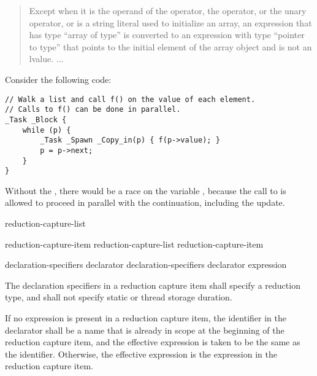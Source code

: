 \begin{quote}
Except when it
is the operand of the  operator,
the  operator,
or the unary \tcode{\&} operator,
or is a string literal used to initialize an array,
an expression that has type ``array of type''
is converted to an expression with type ``pointer to type''
that points to the initial element of the array object
and is not an lvalue. ...
\end{quote}

\begin{example}
Consider the following code:

\begin{verbatim}
// Walk a list and call f() on the value of each element.
// Calls to f() can be done in parallel.
_Task _Block {
    while (p) {
        _Task _Spawn _Copy_in(p) { f(p->value); }
        p = p->next;
    }
}
\end{verbatim}
Without the ,
there would be a race on the variable ,
because the call to 
is allowed to proceed in parallel with the continuation,
including the update.
\end{example}



\begin{bnf}
\br
{} \terminal{(} reduction-capture-list \terminal{)}
\end{bnf}

\begin{bnf}
\br
reduction-capture-item
\br
reduction-capture-list \terminal{,} reduction-capture-item
\end{bnf}

\begin{bnf}
\br
declaration-specifiers declarator
\br
declaration-specifiers declarator \terminal{:} expression
\end{bnf}


\pnum
The declaration specifiers in a reduction capture item
shall specify a reduction type,
and shall not specify static or thread storage duration.

\pnum
If no expression is present in a reduction capture item,
the identifier in the declarator
shall be a name that is already in scope
at the beginning of the reduction capture item,
and the effective expression is taken to be the same as the identifier.
Otherwise, the effective expression
is the expression in the reduction capture item.

